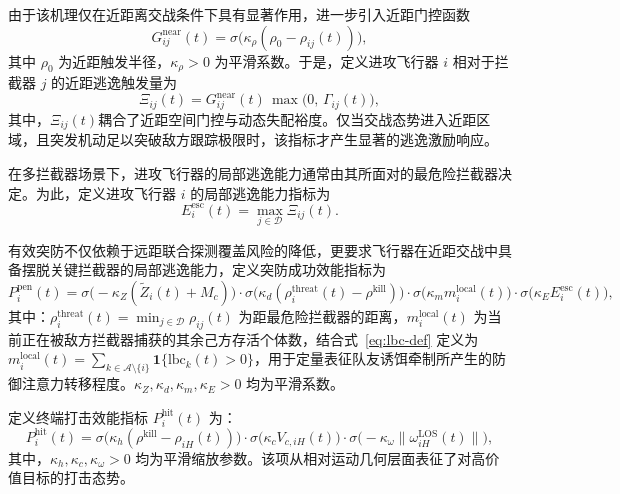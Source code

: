 由于该机理仅在近距离交战条件下具有显著作用，进一步引入近距门控函数
\begin{equation}
G_{ij}^{\mathrm{near}}(t)
=
\sigma\!\bigl(\kappa_{\rho}(\rho_0-\rho_{ij}(t))\bigr),
\end{equation}
其中 $\rho_0$ 为近距触发半径，$\kappa_{\rho}>0$ 为平滑系数。于是，定义进攻飞行器 $i$ 相对于拦截器 $j$ 的近距逃逸触发量为
\begin{equation}
\Xi_{ij}(t)
=
G_{ij}^{\mathrm{near}}(t)\,\max\bigl(0,\, \Gamma_{ij}(t)\bigr),
\end{equation}
其中，$\Xi_{ij}(t)$耦合了近距空间门控与动态失配裕度。仅当交战态势进入近距区域，且突发机动足以突破敌方跟踪极限时，该指标才产生显著的逃逸激励响应。

在多拦截器场景下，进攻飞行器的局部逃逸能力通常由其所面对的最危险拦截器决定。为此，定义进攻飞行器 $i$ 的局部逃逸能力指标为
\begin{equation}
E_i^{\mathrm{esc}}(t)
=
\max_{j\in\mathcal{D}} \Xi_{ij}(t).
\end{equation}

有效突防不仅依赖于远距联合探测覆盖风险的降低，更要求飞行器在近距交战中具备摆脱关键拦截器的局部逃逸能力，定义突防成功效能指标为
\begin{equation}
P_i^{\mathrm{pen}}(t)
=
\sigma\!\bigl(-\kappa_Z(\widetilde Z_i(t)+M_c)\bigr)
\cdot
\sigma\!\bigl(\kappa_d(\rho_i^{\mathrm{threat}}(t)-\rho^{\mathrm{kill}})\bigr)
\cdot
\sigma\!\bigl(\kappa_m m_i^{\mathrm{local}}(t)\bigr)
\cdot
\sigma\!\bigl(\kappa_E E_i^{\mathrm{esc}}(t)\bigr),
\label{eq:P_pen_def}
\end{equation}
其中：$\rho_i^{\mathrm{threat}}(t)=\min_{j\in\mathcal{D}}\rho_{ij}(t)$ 为距最危险拦截器的距离，$m_i^{\mathrm{local}}(t)$ 为当前正在被敌方拦截器捕获的其余己方存活个体数，结合式~\eqref{eq:lbc-def} 定义为 $m_i^{\mathrm{local}}(t)=\sum_{k\in\mathcal{A}\setminus\{i\}}\mathbf{1}\{\mathrm{lbc}_k(t)>0\}$，用于定量表征队友诱饵牵制所产生的防御注意力转移程度。$\kappa_Z,\kappa_d,\kappa_m,\kappa_E>0$ 均为平滑系数。

定义终端打击效能指标 $P_i^{\mathrm{hit}}(t)$ 为：
\begin{equation}
P_i^{\mathrm{hit}}(t)
=
\sigma\!\bigl(\kappa_h(\rho^{\mathrm{kill}}-\rho_{iH}(t))\bigr)
\cdot
\sigma\!\bigl(\kappa_c V_{c,iH}(t)\bigr)
\cdot
\sigma\!\bigl(-\kappa_{\omega}\|\omega_{iH}^{\mathrm{LOS}}(t)\|\bigr),
\label{eq:P_hit_def}
\end{equation}
其中，$\kappa_h,\kappa_c,\kappa_{\omega}>0$ 均为平滑缩放参数。该项从相对运动几何层面表征了对高价值目标的打击态势。

